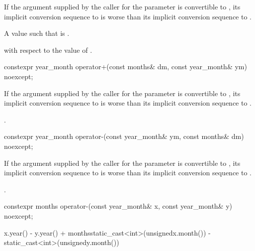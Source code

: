 \begin{itemdescr}
\pnum
\constraints
If the argument supplied by the caller for the  parameter
is convertible to ,
its implicit conversion sequence to 
is worse than its implicit conversion sequence to
.

\pnum
\returns
A  value  such that 
is .

\pnum
\complexity
{} with respect to the value of .
\end{itemdescr}

%
\begin{itemdecl}
constexpr year_month operator+(const months& dm, const year_month& ym) noexcept;
\end{itemdecl}

\begin{itemdescr}
\pnum
\constraints
If the argument supplied by the caller for the  parameter
is convertible to ,
its implicit conversion sequence to 
is worse than its implicit conversion sequence to
.

\pnum
\returns
{}.
\end{itemdescr}

%
\begin{itemdecl}
constexpr year_month operator-(const year_month& ym, const months& dm) noexcept;
\end{itemdecl}

\begin{itemdescr}
\pnum
\constraints
If the argument supplied by the caller for the  parameter
is convertible to ,
its implicit conversion sequence to 
is worse than its implicit conversion sequence to
.

\pnum
\returns
{}.
\end{itemdescr}

%
\begin{itemdecl}
constexpr months operator-(const year_month& x, const year_month& y) noexcept;
\end{itemdecl}

\begin{itemdescr}
\pnum
\returns
\begin{codeblock}
x.year() - y.year() + months{static_cast<int>(unsigned{x.month()}) -
                             static_cast<int>(unsigned{y.month()})}
\end{codeblock}
\end{itemdescr}

